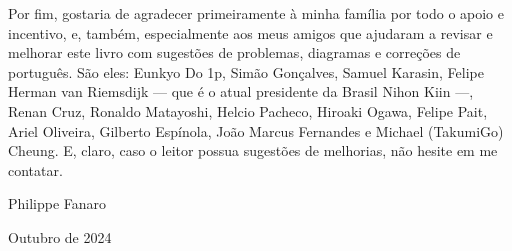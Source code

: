 Por fim, gostaria de agradecer primeiramente à minha família por todo o apoio e incentivo, e, também, especialmente aos meus amigos que ajudaram a revisar e melhorar este livro com sugestões de problemas, diagramas e correções de português. São eles: Eunkyo Do 1p, Simão Gonçalves, Samuel Karasin, Felipe Herman van Riemsdijk --- que é o atual presidente da Brasil Nihon Kiin ---, Renan Cruz, Ronaldo Matayoshi, Helcio Pacheco, Hiroaki Ogawa, Felipe Pait, Ariel Oliveira, Gilberto Espínola, João Marcus Fernandes e Michael (TakumiGo) Cheung. E, claro, caso o leitor possua sugestões de melhorias, não hesite em me contatar.

\bigskip

\hspace*{\fill} Philippe Fanaro \hspace{0.055cm}

\hspace*{\fill} Outubro de 2024 \hspace{0.05cm}

\clearedpage
\clearedpage